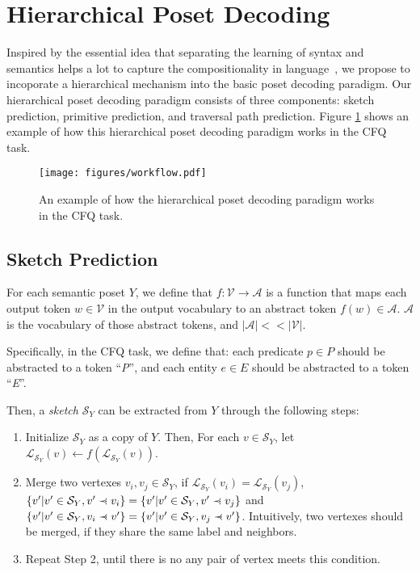 \documentclass{article}
\newcommand{\precdot}{\prec\mathrel{\mkern-5mu}\mathrel{\cdot}}
\begin{document}
\section{Hierarchical Poset Decoding}
\label{sec:HPD}

Inspired by the essential idea that separating the learning of syntax and semantics helps a lot to capture the compositionality in language~\citep{russin2019compositional, li2019compositional, lake2019compositional, gordon2020permutation}, we propose to incoporate a hierarchical mechanism into the basic poset decoding paradigm.
Our hierarchical poset decoding paradigm consists of three components:
sketch prediction, primitive prediction, and traversal path prediction.
Figure \ref{fig:workflow} shows an example of how this hierarchical poset decoding paradigm works in the CFQ task.

\begin{figure}
\centering
\texttt{[image: figures/workflow.pdf]}
\caption{An example of how the hierarchical poset decoding paradigm works in the CFQ task.}
\label{fig:workflow}
\end{figure}





\subsection{Sketch Prediction}
\label{sec:sketch_prediction}

For each semantic poset $Y$, we define that $f:\mathcal{V}\to\mathcal{A}$ is a function that maps each output token $w\in\mathcal{V}$ in the output vocabulary to an abstract token $f(w)\in\mathcal{A}$.
$\mathcal{A}$ is the vocabulary of those abstract tokens, and $|\mathcal{A}|<<|\mathcal{V}|$.

Specifically, in the CFQ task, we define that: each predicate $p\in P$ should be abstracted to a token ``\emph{P}'', and each entity $e\in E$ should be abstracted to a token ``\emph{E}''.

Then, a \emph{sketch} $\mathcal{S}_Y$ can be extracted from $Y$ through the following steps:

\begin{enumerate}
\item Initialize $\mathcal{S}_Y$ as a copy of $Y$. Then, For each $v\in \mathcal{S}_Y$, let $\mathcal{L}_{\mathcal{S}_Y}(v)\gets f(\mathcal{L}_{\mathcal{S}_Y}(v))$.
\item Merge two vertexes $v_i, v_j\in \mathcal{S}_Y$, if $\mathcal{L}_{\mathcal{S}_Y}(v_i) = \mathcal{L}_{\mathcal{S}_Y}(v_j)$, $\{v'|v'\in\mathcal{S}_Y, v'\precdot v_i\} = \{v'|v'\in\mathcal{S}_Y, v'\precdot v_j\}$ and $\{v'|v'\in\mathcal{S}_Y, v_i\precdot v'\} = \{v'|v'\in\mathcal{S}_Y, v_j\precdot v'\}$.
Intuitively, two vertexes should be merged, if they share the same label and neighbors.
\item Repeat Step 2, until there is no any pair of vertex meets this condition.
\end{enumerate}
\end{document}
